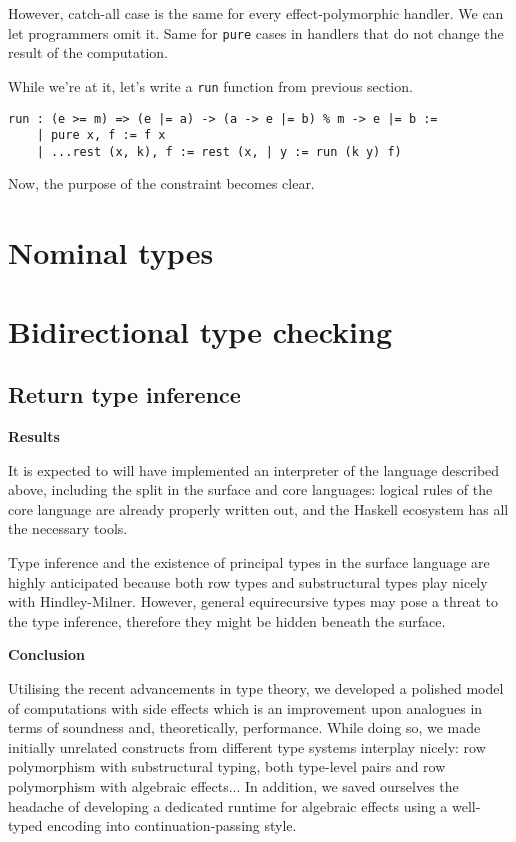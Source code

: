 \documentclass[a4paper,14pt]{extreport}
\begin{document}
However, catch-all case is the same for every effect-polymorphic handler. We can
let programmers omit it. Same for \verb|pure| cases in handlers that do not
change the result of the computation.

While we're at it, let's write a \verb|run| function from previous section.

\begin{verbatim}
run : (e >= m) => (e |= a) -> (a -> e |= b) % m -> e |= b :=
    | pure x, f := f x
    | ...rest (x, k), f := rest (x, | y := run (k y) f)
\end{verbatim}

Now, the purpose of the constraint becomes clear.

\section{Nominal types}

\section{Bidirectional type checking}

\subsection{Return type inference}

\textbf{Results}

It is expected to will have implemented an interpreter of the language described
above, including the split in the surface and core languages: logical rules of
the core language are already properly written out, and the Haskell ecosystem
has all the necessary tools.

Type inference and the existence of principal types in the surface language are
highly anticipated because both row types and substructural types play nicely
with Hindley-Milner. However, general equirecursive types may pose a threat to
the type inference, therefore they might be hidden beneath the surface.

\textbf{Conclusion}

Utilising the recent advancements in type theory, we developed a polished model
of computations with side effects which is an improvement upon analogues in
terms of soundness and, theoretically, performance. While doing so, we made
initially unrelated constructs from different type systems interplay nicely: row
polymorphism with substructural typing, both type-level pairs and row
polymorphism with algebraic effects... In addition, we saved ourselves the
headache of developing a dedicated runtime for algebraic effects using a
well-typed encoding into continuation-passing style.
\end{document}
